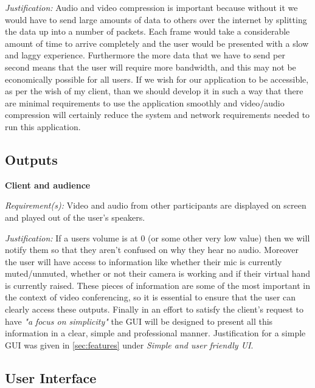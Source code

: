 \textit{Justification:}
Audio and video compression is important because
without it we would have to send large amounts
of data to others over the internet by splitting
the data up into a number of packets. Each frame
would take a considerable amount of time to arrive
completely and the user would be presented with a
slow and laggy experience. Furthermore the more
data that we have to send per second means that
the user will require more bandwidth, and this may
not be economically possible for all users. If we
wish for our application to be accessible, as per
the wish of my client, than we should develop it in
such a way that there are minimal requirements
to use the application smoothly and video/audio
compression will certainly reduce the
system and network requirements needed to run
this application.
\\ \vspace{0.2cm}

\subsection{Outputs}

\textsf{\bfseries Client and audience} \\ \vspace{0.1cm}

\textit{Requirement(s):} Video and audio from other participants
are displayed on screen and played out of the user's speakers.\\ \vspace{0.1cm}

\textit{Justification:}
 If a users volume is at 0 (or some
other very low value) then we will
notify them so that they aren't confused on why they hear no
audio. Moreover the user will have access to
information like whether their mic is currently muted/unmuted,
whether or not their camera is working and if their virtual
hand is currently raised.
These pieces of information are
some of the most important in the context of video
conferencing, so it is essential to ensure that the user can
clearly access these outputs. Finally in an effort to satisfy
the client's request to have \textit{"a focus on simplicity"}
the GUI will be designed to present all this information in a
clear, simple and professional manner. Justification for a
simple GUI was given in \ref{sec:features} under
\textit{Simple and user friendly UI}.

\subsection{User Interface}
\label{sec:ui}


